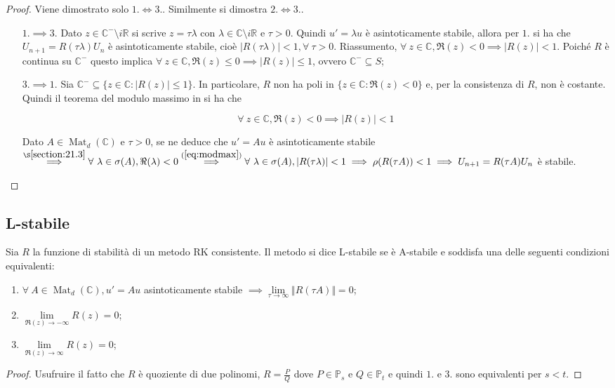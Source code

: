 \documentclass[hidelinks, 10pt]{report}
\DeclareMathOperator{\Mat}{Mat}
\begin{document}
\begin{proof}
Viene dimostrato solo $ 1. \iff 3. $. Similmente si dimostra $ 2. \iff 3. $.
\begin{itemize}
\item[$ 1. \implies 3. $] Dato $ z \in \mathbb{C}^{-} \setminus i\mathbb{R} $ si scrive $ z = \tau \lambda $ con $ \lambda \in \mathbb{C} \setminus i\mathbb{R} $ e $ \tau > 0 $. Quindi $ u' = \lambda u $ \`e asintoticamente stabile, allora per $ 1. $ si ha che $ U_{n + 1} = R(\tau \lambda) U_{n} $ \`e asintoticamente stabile, cio\`e $ \vert R(\tau \lambda) \vert < 1, \forall\ \tau > 0 $. Riassumento, $ \forall\ z \in \mathbb{C}, \Re (z) < 0 \implies \vert R(z) \vert < 1 $. Poich\'e $ R $ \`e continua su $ \mathbb{C}^{-} $ questo implica $ \forall\ z \in \mathbb{C}, \Re(z) \le 0 \implies \vert R(z) \vert \le 1 $, ovvero $ \mathbb{C}^{-} \subseteq S $;
\item[$ 3. \implies 1. $] Sia $ \mathbb{C}^{-} \subseteq \{ z \in \mathbb{C} : \vert R(z) \vert \le 1 \} $. In particolare, $ R $ non ha poli in $ \{ z \in \mathbb{C} : \Re(z) < 0 \} $ e, per la consistenza di $ R $, non \`e costante. Quindi il teorema del modulo massimo in  si ha che

\begin{equation}	\label{eq:modmax}
\forall\ z \in \mathbb{C}, \Re (z) < 0 \implies \vert R(z) \vert < 1
\end{equation}

Dato $ A \in \Mat_{d}(\mathbb{C}) $ e $ \tau > 0 $, se ne deduce che $ u' = Au $ \`e asintoticamente stabile $ \stackrel{\refsec{21.3}}{\implies} \forall\ \lambda \in \sigma(A), \Re(\lambda) < 0 \stackrel{(\ref{eq:modmax})}{\implies} \forall\ \lambda \in \sigma(A), \vert R(\tau \lambda) \vert < 1 \implies \rho (R(\tau A)) < 1 \implies U_{n + 1} = R(\tau A) U_{n} $ \`e stabile. 
\end{itemize}
\end{proof}

\subsection{L-stabile}
Sia $ R $ la funzione di stabilit\`a di un metodo RK consistente. Il metodo si dice L-stabile se \`e A-stabile e soddisfa una delle seguenti condizioni equivalenti:
\begin{enumerate}
\item $ \forall\ A \in \Mat_{d}(\mathbb{C}), u' = A u $ asintoticamente stabile $ \implies \lim\limits_{\tau \to \infty} \Vert R(\tau A) \Vert = 0 $;
\item $ \lim\limits_{\Re(z) \to -\infty} R(z) = 0 $;
\item $ \lim\limits_{\Re(z) \to \infty} R(z) = 0 $;
\end{enumerate}

\begin{proof}
Usufruire il fatto che $ R $ \`e quoziente di due polinomi, $ R = \frac{P}{Q} $ dove $ P \in \mathbb{P}_{s} $ e $ Q \in \mathbb{P}_{t} $ e quindi $ 1. $ e $ 3. $ sono equivalenti per $ s < t $.
\end{proof}
\end{document}
